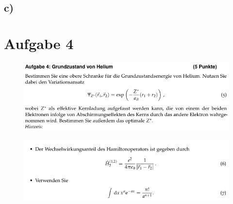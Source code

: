 \subsection{c)}

\section{Aufgabe 4}
\begin{figure}[H]
    \centering
    \includegraphics[width=\textwidth]{images/Aufgabe4a.jpg}
\end{figure}

\begin{figure}[H]
    \centering
    \includegraphics[width=\textwidth]{images/Aufgabe4b.jpg}
\end{figure}


